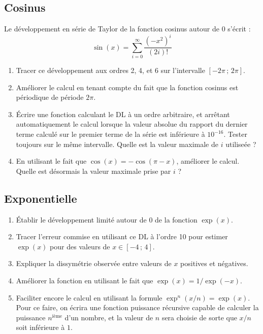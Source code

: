 \subsection{Cosinus}
Le développement en série de Taylor de la fonction cosinus autour de $0$ s'écrit : 
\begin{equation}
\sin(x) = \sum_{i=0}^\infty \frac{(-x^{2})^i}{(2i)!} 
\end{equation}
\begin{enumerate}
\item Tracer ce développement aux ordres 2, 4, et 6 sur l'intervalle $[-2\pi\,;\,2\pi]$.
\item Améliorer le calcul en tenant compte du fait que la fonction cosinus est
périodique de période $2\pi$. 
\item Écrire une fonction calculant le DL à un ordre arbitraire, et arrêtant automatiquement le calcul lorsque la valeur absolue du rapport 
du dernier terme calculé sur le premier terme de la série est inférieure à $10^{-16}$. Tester toujours sur le même intervalle. Quelle est la valeur maximale de $i$ utiliseée ? 
\item En utilisant le fait que $\cos(x) = -\cos(\pi-x)$, améliorer le calcul. Quelle
est désormais la valeur maximale prise par $i$ ?
 \end{enumerate}
\subsection{Exponentielle}
\begin{enumerate}
\item Établir le développement limité autour de 0 de la fonction $\exp(x)$.
\item Tracer l'erreur commise en utilisant ce DL à l'ordre 10 pour estimer $\exp(x)$
pour des valeurs de $x \in [-4\,;\,4]$.
\item Expliquer la dissymétrie observée entre 
valeurs de $x$ positives et négatives. 
\item Améliorer la fonction en utilisant le fait que $\exp(x) = 1/\exp(-x)$.
\item Faciliter encore le calcul en utilisant la formule $\exp^n(x/n) = \exp(x)$. 
Pour ce faire, on écrira une fonction puissance 
récursive  capable
de calculer la puissance $n^\textrm{ième}$ d'un nombre, et la valeur de $n$ 
sera choisie de sorte que $x/n$ soit inférieure à $1$. 
\end{enumerate}

